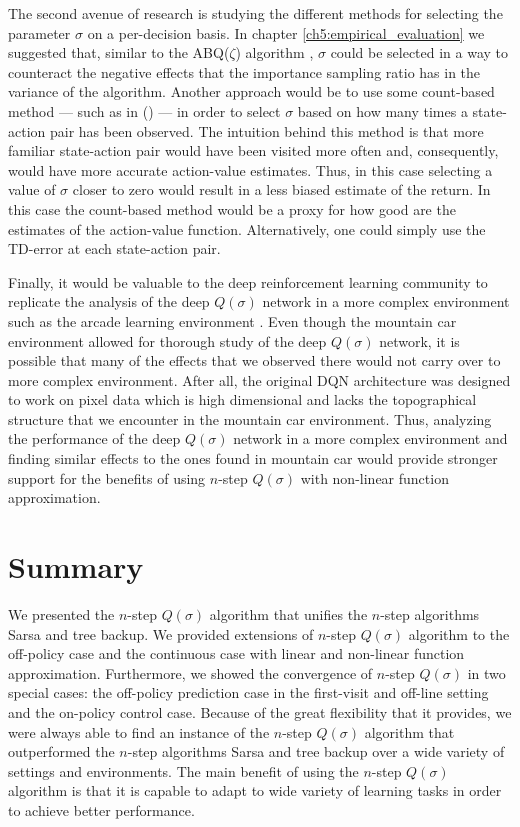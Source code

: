 The second avenue of research is studying the different methods for selecting the parameter $\sigma$ on a per-decision basis.
In chapter \ref{ch5:empirical_evaluation} we suggested that, similar to the ABQ($\zeta$) algorithm \parencite{rupam2017}, $\sigma$ could be selected in a way to counteract the negative effects that the importance sampling ratio has in the variance of the algorithm.
Another approach would be to use some count-based method --- such as in \citeauthor{bellemare2016} (\citeyear{bellemare2016}) --- in order to select $\sigma$ based on how many times a state-action pair has been observed.
The intuition behind this method is that more familiar state-action pair would have been visited more often and, consequently, would have more accurate action-value estimates.
Thus, in this case selecting a value of $\sigma$ closer to zero would result in a less biased estimate of the return.
In this case the count-based method would be a proxy for how good are the estimates of the action-value function.
Alternatively, one could simply use the TD-error at each state-action pair.

Finally, it would be valuable to the deep reinforcement learning community to replicate the analysis of the deep $Q(\sigma)$ network in a more complex environment such as the arcade learning environment \parencite{bellemare13arcade}.
Even though the mountain car environment allowed for thorough study of the deep $Q(\sigma)$ network, it is possible that many of the effects that we observed there would not carry over to more complex environment.
After all, the original DQN architecture was designed to work on pixel data which is high dimensional and lacks the topographical structure that we encounter in the mountain car environment.
Thus, analyzing the performance of the deep $Q(\sigma)$ network in a more complex environment and finding similar effects to the ones found in mountain car would provide stronger support for the benefits of using $n$-step $Q(\sigma)$ with non-linear function approximation.

\section{Summary}

We presented the $n$-step $Q(\sigma)$ algorithm that unifies the $n$-step algorithms Sarsa and tree backup.
We provided extensions of $n$-step $Q(\sigma)$ algorithm to the off-policy case and the continuous case with linear and non-linear function approximation. 
Furthermore, we showed the convergence of $n$-step $Q(\sigma)$ in two special cases: the off-policy prediction case in the first-visit and off-line setting and the on-policy control case.
Because of the great flexibility that it provides, we were always able to find an instance of the $n$-step $Q(\sigma)$ algorithm that outperformed the $n$-step algorithms Sarsa and tree backup over a wide variety of settings and environments.
The main benefit of using the $n$-step $Q(\sigma)$ algorithm is that it is capable to adapt to wide variety of learning tasks in order to achieve better performance. 

